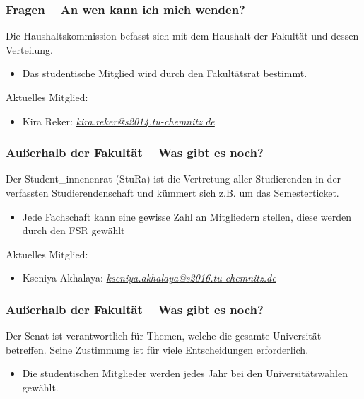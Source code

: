 \documentclass[10pt]{beamer}
\begin{document}
\begin{frame}
\frametitle{Fragen -- An wen kann ich mich wenden?}
\begin{block}{\vphantom{X}}
	Die Haushaltskommission befasst sich mit dem Haushalt der Fakultät und dessen Verteilung.
\end{block}
\begin{itemize}
	\item Das studentische Mitglied wird durch den Fakultätsrat bestimmt.
\end{itemize}
Aktuelles Mitglied:
\begin{itemize}
	\item Kira Reker: \textit{\href{mailto:kira.reker@s2014.tu-chemnitz.de}{kira.reker@s2014.tu-chemnitz.de}}   
\end{itemize}
\end{frame}

\begin{frame}
\frametitle{Außerhalb der Fakultät -- Was gibt es noch?}
\begin{block}{\vphantom{X}}
	Der Student\_innenenrat (StuRa) ist die Vertretung aller Studierenden in der verfassten Studierendenschaft und kümmert sich z.B. um das Semesterticket.
\end{block}
\begin{itemize}
	\item Jede Fachschaft kann eine gewisse Zahl an Mitgliedern stellen, diese werden durch den FSR gewählt
\end{itemize}
Aktuelles Mitglied:
\begin{itemize}
	\item Kseniya Akhalaya: \textit{\href{mailto:kseniya.akhalaya@s2016.tu-chemnitz.de}{kseniya.akhalaya@s2016.tu-chemnitz.de}}
\end{itemize}
\end{frame}

\begin{frame}
\frametitle{Außerhalb der Fakultät -- Was gibt es noch?}
\begin{block}{\vphantom{X}}
	Der Senat ist verantwortlich für Themen, welche die gesamte Universität betreffen. Seine Zustimmung ist für viele Entscheidungen erforderlich.
\end{block}
\begin{itemize}
	\item Die studentischen Mitglieder werden jedes Jahr bei den Universitätswahlen gewählt.
\end{itemize}
\end{frame}
\end{document}
